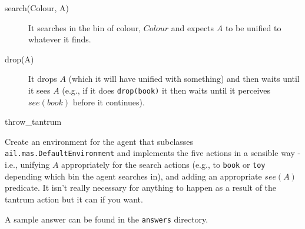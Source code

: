 \documentclass[a4]{article}
\begin{document}
\begin{description}
\item[search(Colour, A)] It searches in the bin of colour, $Colour$ and expects $A$ to be unified to whatever it finds. 
\item[drop(A)] It drops $A$ (which it will have unified with something) and then waits until it sees $A$ (e.g., if it does \texttt{drop(book)} it then waits until it perceives $see(book)$ before it continues).
\item[throw\_tantrum]
\end{description}

\begin{sloppypar}
Create an environment for the agent that subclasses \texttt{ail.mas.DefaultEnvironment} and implements the five actions in a sensible way - i.e., unifying $A$ appropriately for the search actions (e.g., to \texttt{book} or \texttt{toy} depending which bin the agent searches in), and adding an appropriate $see(A)$ predicate.  It isn't really necessary for anything to happen as a result of the tantrum action but it can if you want.
\end{sloppypar}

A sample answer can be found in the \texttt{answers} directory.
\end{document}
